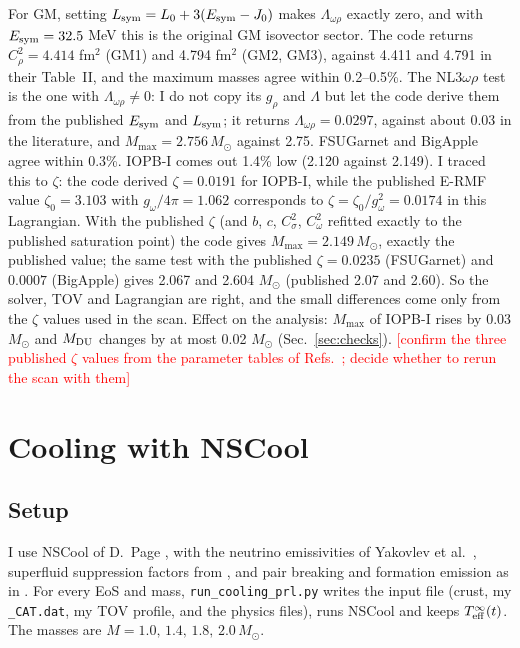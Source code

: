 \documentclass[11pt,a4paper]{article}
\newcommand{\fillin}[1]{\textcolor{red}{[#1]}}
\newcommand{\Esym}{E_{\rm sym}}
\newcommand{\Lsym}{L_{\rm sym}}
\newcommand{\Msun}{M_\odot}
\begin{document}
For GM, setting $\Lsym=L_0+3(\Esym-J_0)$ makes $\Lambda_{\omega\rho}$ exactly zero, and with $\Esym=32.5$ MeV this is the original GM isovector sector. The code returns $C_\rho^2=4.414$ fm$^2$ (GM1) and 4.794 fm$^2$ (GM2, GM3), against 4.411 and 4.791 in their Table~II, and the maximum masses agree within 0.2--0.5\%. The NL3$\omega\rho$ test is the one with $\Lambda_{\omega\rho}\ne0$: I do not copy its $g_\rho$ and $\Lambda$ but let the code derive them from the published $\Esym$ and $\Lsym$; it returns $\Lambda_{\omega\rho}=0.0297$, against about 0.03 in the literature, and $M_{\max}=2.756\,\Msun$ against 2.75. FSUGarnet and BigApple agree within 0.3\%. IOPB-I comes out 1.4\% low (2.120 against 2.149). I traced this to $\zeta$: the code derived $\zeta=0.0191$ for IOPB-I, while the published E-RMF value $\zeta_0=3.103$ with $g_\omega/4\pi=1.062$ \cite{IOPBI} corresponds to $\zeta=\zeta_0/g_\omega^2=0.0174$ in this Lagrangian. With the published $\zeta$ (and $b$, $c$, $C_\sigma^2$, $C_\omega^2$ refitted exactly to the published saturation point) the code gives $M_{\max}=2.149\,\Msun$, exactly the published value; the same test with the published $\zeta=0.0235$ (FSUGarnet) and $0.0007$ (BigApple) gives 2.067 and 2.604 $\Msun$ (published 2.07 and 2.60). So the solver, TOV and Lagrangian are right, and the small differences come only from the $\zeta$ values used in the scan. Effect on the analysis: $M_{\max}$ of IOPB-I rises by 0.03 $\Msun$ and $M_{\rm DU}$ changes by at most 0.02 $\Msun$ (Sec.~\ref{sec:checks}). \fillin{confirm the three published $\zeta$ values from the parameter tables of Refs.~\cite{FSUGarnet,IOPBI,BigApple}; decide whether to rerun the scan with them}

\section{Cooling with NSCool}\label{sec:cooling}
\subsection{Setup}
I use NSCool of D.~Page \cite{NSCool}, with the neutrino emissivities of Yakovlev et al.\ \cite{Yakovlev2001}, superfluid suppression factors from \cite{Yakovlev1999}, and pair breaking and formation emission as in \cite{Page2009}. For every EoS and mass, \texttt{run\_cooling\_prl.py} writes the input file (crust, my \texttt{\_CAT.dat}, my TOV profile, and the physics files), runs NSCool and keeps $T_{\rm eff}^\infty(t)$. The masses are $M=1.0,\,1.4,\,1.8,\,2.0\,\Msun$.
\end{document}
